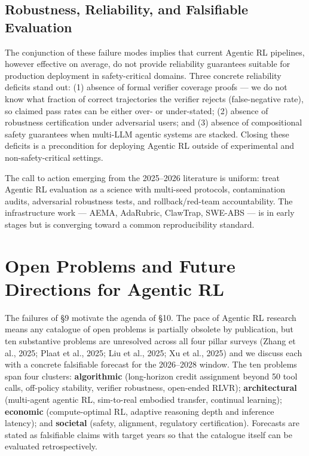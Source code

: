 \subsection{Robustness, Reliability, and Falsifiable Evaluation}\label{robustness-reliability-and-falsifiable-evaluation}

The conjunction of these failure modes implies that current Agentic RL pipelines, however effective on average, do not provide reliability guarantees suitable for production deployment in safety-critical domains. Three concrete reliability deficits stand out: (1) absence of formal verifier coverage proofs --- we do not know what fraction of correct trajectories the verifier rejects (false-negative rate), so claimed pass rates can be either over- or under-stated; (2) absence of robustness certification under adversarial users; and (3) absence of compositional safety guarantees when multi-LLM agentic systems are stacked. Closing these deficits is a precondition for deploying Agentic RL outside of experimental and non-safety-critical settings.

The call to action emerging from the 2025--2026 literature is uniform: treat Agentic RL evaluation as a science with multi-seed protocols, contamination audits, adversarial robustness tests, and rollback/red-team accountability. The infrastructure work --- AEMA, AdaRubric, ClawTrap, SWE-ABS --- is in early stages but is converging toward a common reproducibility standard.

\section{Open Problems and Future Directions for Agentic RL}\label{open-problems-and-future-directions-for-agentic-rl}

The failures of §9 motivate the agenda of §10. The pace of Agentic RL research means any catalogue of open problems is partially obsolete by publication, but ten substantive problems are unresolved across all four pillar surveys (Zhang et al., 2025; Plaat et al., 2025; Liu et al., 2025; Xu et al., 2025) and we discuss each with a concrete falsifiable forecast for the 2026--2028 window. The ten problems span four clusters: \textbf{algorithmic} (long-horizon credit assignment beyond 50 tool calls, off-policy stability, verifier robustness, open-ended RLVR); \textbf{architectural} (multi-agent agentic RL, sim-to-real embodied transfer, continual learning); \textbf{economic} (compute-optimal RL, adaptive reasoning depth and inference latency); and \textbf{societal} (safety, alignment, regulatory certification). Forecasts are stated as falsifiable claims with target years so that the catalogue itself can be evaluated retrospectively.

